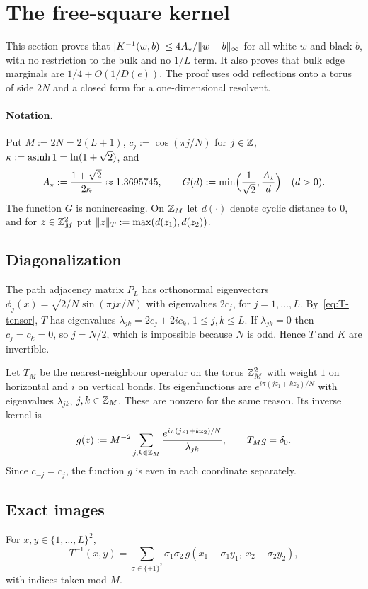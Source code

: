 \section{The free-square kernel}\label{sec:kernel}

This section proves that $\lvert K^{-1}(w,b)\rvert\le 4A_\star/\lVert w-b\rVert_\infty$ for all white $w$ and black $b$, with no restriction to the bulk and no $1/L$ term. It also proves that bulk edge marginals are $1/4+O(1/D(e))$. The proof uses odd reflections onto a torus of side $2N$ and a closed form for a one-dimensional resolvent.

\paragraph{Notation.} Put $M:=2N=2(L+1)$, $c_j:=\cos(\pi j/N)$ for $j\in\mathbb{Z}$, $\kappa:=\operatorname{asinh}1=\ln(1+\sqrt2)$, and
\[
  A_\star:=\frac{1+\sqrt2}{2\kappa}\approx1.3695745,\qquad G(d):=\min\Bigl(\frac1{\sqrt2},\frac{A_\star}{d}\Bigr)\quad(d>0).
\]
The function $G$ is nonincreasing. On $\mathbb{Z}_M$ let $d(\cdot)$ denote cyclic distance to $0$, and for $z\in\mathbb{Z}_M^2$ put $\lVert z\rVert_T:=\max(d(z_1),d(z_2))$.

\subsection{Diagonalization}\label{sec:kernel-diag}

The path adjacency matrix $P_L$ has orthonormal eigenvectors $\phi_j(x)=\sqrt{2/N}\sin(\pi jx/N)$ with eigenvalues $2c_j$, for $j=1,\dots,L$. By~\eqref{eq:T-tensor}, $T$ has eigenvalues $\lambda_{jk}=2c_j+2ic_k$, $1\le j,k\le L$. If $\lambda_{jk}=0$ then $c_j=c_k=0$, so $j=N/2$, which is impossible because $N$ is odd. Hence $T$ and $K$ are invertible.

Let $T_M$ be the nearest-neighbour operator on the torus $\mathbb{Z}_M^2$ with weight $1$ on horizontal and $i$ on vertical bonds. Its eigenfunctions are $e^{i\pi(jz_1+kz_2)/N}$ with eigenvalues $\lambda_{jk}$, $j,k\in\mathbb{Z}_M$. These are nonzero for the same reason. Its inverse kernel is
\[
  g(z):=M^{-2}\sum_{j,k\in\mathbb{Z}_M}\frac{e^{i\pi(jz_1+kz_2)/N}}{\lambda_{jk}},\qquad T_Mg=\delta_0 .
\]
Since $c_{-j}=c_j$, the function $g$ is even in each coordinate separately.

\subsection{Exact images}

\begin{lemma}[images]\label{lem:images}
For $x,y\in\{1,\dots,L\}^2$,
\[
  T^{-1}(x,y)=\sum_{\sigma\in\{\pm1\}^2}\sigma_1\sigma_2\,g(x_1-\sigma_1y_1,\ x_2-\sigma_2y_2),
\]
with indices taken mod $M$.
\end{lemma}

